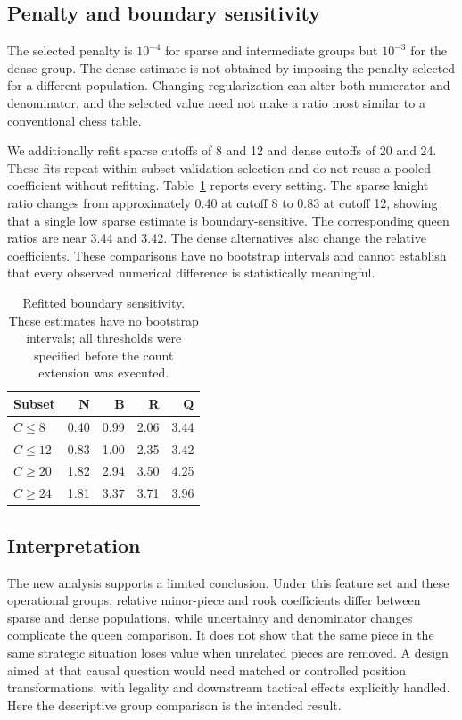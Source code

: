 \documentclass{jcst}
\begin{document}
\subsection{Penalty and boundary sensitivity}
The selected penalty is $10^{-4}$ for sparse and intermediate groups but $10^{-3}$ for the dense group. The dense estimate is not obtained by imposing the penalty selected for a different population. Changing regularization can alter both numerator and denominator, and the selected value need not make a ratio most similar to a conventional chess table.

We additionally refit sparse cutoffs of 8 and 12 and dense cutoffs of 20 and 24. These fits repeat within-subset validation selection and do not reuse a pooled coefficient without refitting. Table~\ref{tab:countsensitivity} reports every setting. The sparse knight ratio changes from approximately 0.40 at cutoff 8 to 0.83 at cutoff 12, showing that a single low sparse estimate is boundary-sensitive. The corresponding queen ratios are near 3.44 and 3.42. The dense alternatives also change the relative coefficients. These comparisons have no bootstrap intervals and cannot establish that every observed numerical difference is statistically meaningful.
\begin{table}[tbp]\centering
\small
\caption{Refitted boundary sensitivity. These estimates have no bootstrap intervals; all thresholds were specified before the count extension was executed.}\label{tab:countsensitivity}
\begin{tabular}{lrrrr}
\toprule
Subset & N & B & R & Q\\\midrule
$C\leq 8$ & 0.40 & 0.99 & 2.06 & 3.44\\
$C\leq 12$ & 0.83 & 1.00 & 2.35 & 3.42\\
$C\geq 20$ & 1.82 & 2.94 & 3.50 & 4.25\\
$C\geq 24$ & 1.81 & 3.37 & 3.71 & 3.96\\
\bottomrule\end{tabular}\end{table}

\subsection{Interpretation}
The new analysis supports a limited conclusion. Under this feature set and these operational groups, relative minor-piece and rook coefficients differ between sparse and dense populations, while uncertainty and denominator changes complicate the queen comparison. It does not show that the same piece in the same strategic situation loses value when unrelated pieces are removed. A design aimed at that causal question would need matched or controlled position transformations, with legality and downstream tactical effects explicitly handled. Here the descriptive group comparison is the intended result.
\end{document}
